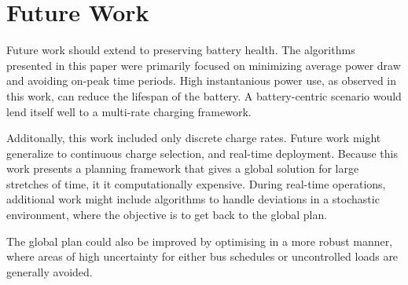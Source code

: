\section{Future Work}
Future work should extend to preserving battery health.  The algorithms presented in this paper were primarily focused on minimizing average power draw and avoiding on-peak time periods.  High instantanious power use, as observed in this work, can reduce the lifespan of the battery.  A battery-centric scenario would lend itself well to a multi-rate charging framework.
\par Additonally, this work included only discrete charge rates.  Future work might generalize to continuous charge selection, and real-time deployment.  Because this work presents a planning framework that gives a global solution for large stretches of time, it it computationally expensive.  During real-time operations, additional work might include algorithms to handle deviations in a stochastic environment, where the objective is to get back to the global plan.  
\par The global plan could also be improved by optimising in a more robust manner, where areas of high uncertainty for either bus schedules or uncontrolled loads are generally avoided.
